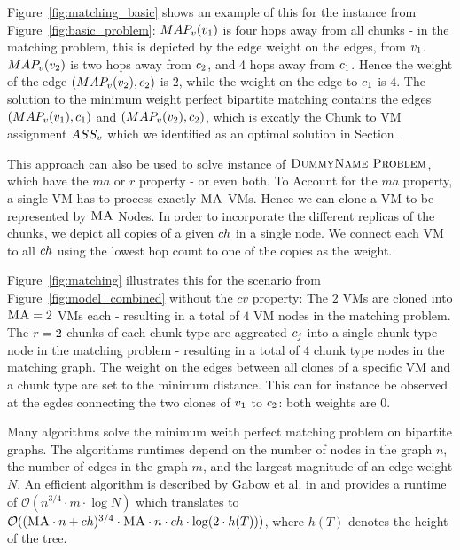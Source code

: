 Figure~\ref{fig:matching_basic} shows an example of this for the instance from 
Figure~\ref{fig:basic_problem}: $MAP_v(v_1)$ is four hops 
away from all chunks - in the matching problem, this is depicted by the edge 
weight on the edges, from $v_1$. $MAP_v(v_2)$ is 
two hops away from $c_2$, and 4 hops away from $c_1$. Hence the 
weight of the edge $(MAP_v(v_2),c_2)$ is $2$, while the 
weight on the edge to $c_1$ is $4$. The solution to the minimum weight 
perfect bipartite matching contains the edges $(MAP_v(v_1), 
c_1)$ and $(MAP_v(v_2), 
c_2)$, which is excatly the Chunk to VM assignment $ASS_v$ 
which we identified as an optimal solution in Section~.


This approach can also be used to solve instance of $\textsc{DummyName Problem}$, which have the 
$ma$ or $r$ property - or even both. 
To Account for the $ma$ property, a single VM has to process exactly 
$\textsc{MA}$ VMs. Hence we can clone a VM to be represented by $\textsc{MA}$ Nodes.
In order to incorporate the different 
replicas of the chunks, we depict all copies of a given $ch$ in a 
single %
node. We connect each VM to all $ch$ using the 
lowest hop count to one of the copies as the weight.

Figure~\ref{fig:matching} illustrates this for the scenario from 
Figure~\ref{fig:model_combined} without the $cv$ property: The $2$ VMs are 
cloned into $\textsc{MA} = 2$ VMs each - resulting in a total of $4$ VM nodes in 
the matching problem. The $r = 2$ chunks of each chunk type are 
aggreated $c_j$ into a single chunk type node in the matching problem - 
resulting in a total of $4$ chunk type nodes in the matching graph. The weight 
on the edges between all clones of a specific VM and a chunk type are set to 
the minimum distance. This can for instance be observed at the egdes connecting 
the two clones of $v_1$ to $c_2$: both weights are 0.



Many algorithms solve the minimum weith perfect matching problem on bipartite 
graphs. The algorithms runtimes depend on  the number of nodes in the 
graph $n$, the number of edges in the graph $m$, and the largest magnitude of 
an edge weight $N$. An efficient algorithm is described by Gabow et al. in 
\cite{gabow_scaling_algorithm} and provides a runtime of $\mathcal{O}(n^{3/4} 
\cdot m \cdot \log N)$ which translates to $\mathcal{O}((\textsc{MA} \cdot n + 
ch)^{3/4} \cdot  \textsc{MA} \cdot n \cdot ch \cdot \log 
(2 \cdot h(T)))$, where $h(T)$ denotes the height of the tree.